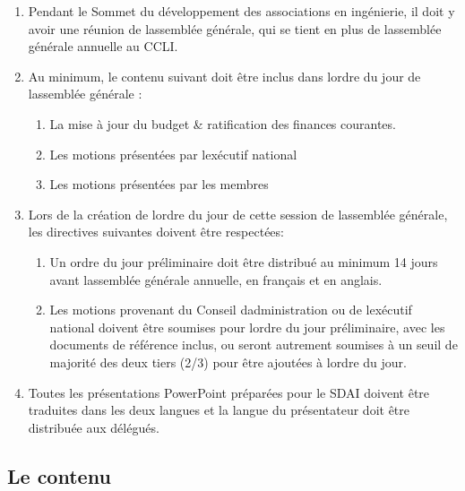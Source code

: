 \begin{enumerate}
 \item
  Pendant le Sommet du développement des associations en ingénierie, il doit y avoir une réunion de l\textquotesingle assemblée générale, qui se tient en plus de l\textquotesingle assemblée générale annuelle au CCLI.
 \item
  Au minimum, le contenu suivant doit être inclus dans l\textquotesingle ordre du jour de l\textquotesingle assemblée générale :

  \begin{enumerate}
   \item
    La mise à jour du budget \& ratification des finances courantes.
   \item
    Les motions présentées par l\textquotesingle exécutif national
   \item
    Les motions présentées par les membres
  \end{enumerate}
 \item
  Lors de la création de l\textquotesingle ordre du jour de cette session de l\textquotesingle assemblée générale, les directives suivantes doivent être respectées:

  \begin{enumerate}
   \item
    Un ordre du jour préliminaire doit être distribué au minimum 14 jours avant l\textquotesingle assemblée générale annuelle, en français et en anglais.
   \item
    Les motions provenant du Conseil d\textquotesingle administration ou de l\textquotesingle exécutif national doivent être soumises pour l\textquotesingle ordre du jour préliminaire, avec les documents de référence inclus, ou seront autrement soumises à un seuil de majorité des deux tiers (2/3) pour être ajoutées à l\textquotesingle ordre du jour.
  \end{enumerate}
 \item
  Toutes les présentations PowerPoint préparées pour le SDAI doivent être traduites dans les deux langues et la langue du présentateur doit être distribuée aux délégués.
\end{enumerate}

\subsection{Le contenu}
\label{le-contenu-1}

